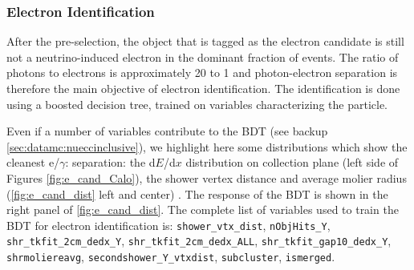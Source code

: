 \subsubsection{Electron Identification}
After the pre-selection, the object that is tagged as the electron candidate is still not a neutrino-induced electron in the dominant fraction of events. The ratio of photons to electrons is approximately 20 to 1 and photon-electron separation is therefore the main objective of electron identification. The identification is done using a boosted decision tree, trained on variables characterizing the particle. 

Even if a number of variables contribute to the BDT (see backup \ref{sec:datamc:nueccinclusive}),  we highlight here some distributions which show the cleanest e/$\gamma$: separation: the  d$E$/d$x$ distribution on  collection plane (left side of Figures \ref{fig:e_cand_Calo}), the shower vertex distance and average molier radius (\cref{fig:e_cand_dist} left and center) . The response of the BDT is shown in the right panel of \cref{fig:e_cand_dist}. The complete list of variables used to train the BDT for electron identification is: \texttt{shower\_vtx\_dist}, \texttt{nObjHits\_Y}, \texttt{shr\_tkfit\_2cm\_dedx\_Y}, \texttt{shr\_tkfit\_2cm\_dedx\_ALL}, \texttt{shr\_tkfit\_gap10\_dedx\_Y}, \texttt{shrmoliereavg}, \texttt{secondshower\_Y\_vtxdist},
\texttt{subcluster}, \texttt{ismerged}.

